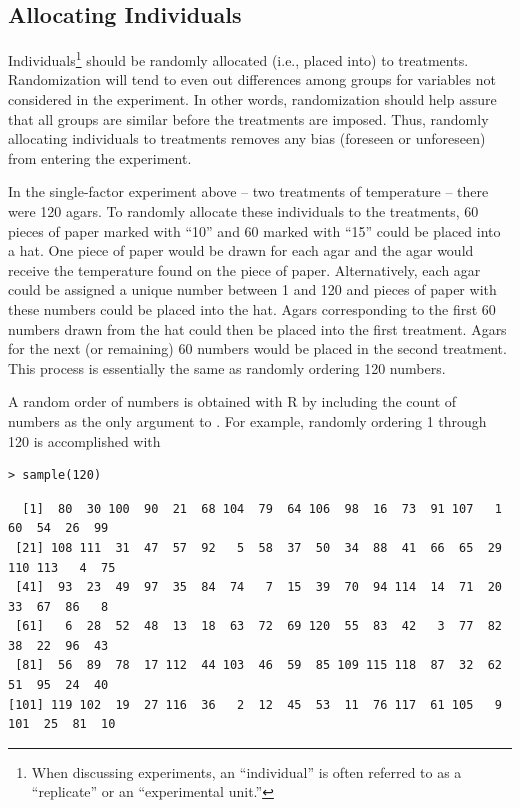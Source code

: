 \documentclass[10pt,openany]{book}\usepackage[]{graphicx}\usepackage[]{color}
\makeatletter
\newenvironment{kframe}{%
 \def\at@end@of@kframe{}%
 \ifinner\ifhmode%
  \def\at@end@of@kframe{\end{minipage}}%
  \begin{minipage}{\columnwidth}%
 \fi\fi%
 \def\FrameCommand##1{\hskip\@totalleftmargin \hskip-\fboxsep
 \colorbox{shadecolor}{##1}\hskip-\fboxsep
     \hskip-\linewidth \hskip-\@totalleftmargin \hskip\columnwidth}%
 \MakeFramed {\advance\hsize-\width
   \@totalleftmargin\z@ \linewidth\hsize
   \@setminipage}}%
 {\par\unskip\endMakeFramed%
 \at@end@of@kframe}
\newenvironment{knitrout}{}{} %
\makeatother
\begin{document}
\subsection{Allocating Individuals}
Individuals\footnote{When discussing experiments, an ``individual'' is often referred to as a ``replicate'' or an ``experimental unit.''} should be randomly allocated (i.e., placed into) to treatments. Randomization will tend to even out differences among groups for variables not considered in the experiment. In other words, randomization should help assure that all groups are similar before the treatments are imposed. Thus, randomly allocating individuals to treatments removes any bias (foreseen or unforeseen) from entering the experiment.

In the single-factor experiment above -- two treatments of temperature -- there were 120 agars. To randomly allocate these individuals to the treatments, 60 pieces of paper marked with ``10'' and 60 marked with ``15'' could be placed into a hat. One piece of paper would be drawn for each agar and the agar would receive the temperature found on the piece of paper. Alternatively, each agar could be assigned a unique number between 1 and 120 and pieces of paper with these numbers could be placed into the hat. Agars corresponding to the first 60 numbers drawn from the hat could then be placed into the first treatment. Agars for the next (or remaining) 60 numbers would be placed in the second treatment. This process is essentially the same as randomly ordering 120 numbers.

A random order of numbers is obtained with R by including the count of numbers as the only argument to . For example, randomly ordering 1 through 120 is accomplished with

\begin{knitrout}
\color{fgcolor}\begin{kframe}
\begin{verbatim}
> sample(120)
\end{verbatim}
\end{kframe}
\end{knitrout}
\vspace{-12pt}
\begin{knitrout}
\color{fgcolor}\begin{kframe}
\begin{verbatim}
  [1]  80  30 100  90  21  68 104  79  64 106  98  16  73  91 107   1  60  54  26  99
 [21] 108 111  31  47  57  92   5  58  37  50  34  88  41  66  65  29 110 113   4  75
 [41]  93  23  49  97  35  84  74   7  15  39  70  94 114  14  71  20  33  67  86   8
 [61]   6  28  52  48  13  18  63  72  69 120  55  83  42   3  77  82  38  22  96  43
 [81]  56  89  78  17 112  44 103  46  59  85 109 115 118  87  32  62  51  95  24  40
[101] 119 102  19  27 116  36   2  12  45  53  11  76 117  61 105   9 101  25  81  10
\end{verbatim}
\end{kframe}
\end{knitrout}
\end{document}
